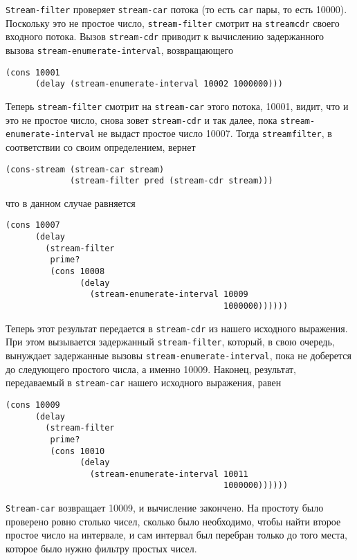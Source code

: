 {\tt Stream-filter} проверяет {\tt stream-car} потока
(то есть {\tt car} пары, то есть 10000).  Поскольку это не
простое число, {\tt stream-filter} смотрит на
{\tt stream\-cdr} своего входного потока.  Вызов %
{\tt stream-cdr} приводит к вычислению задержанного вызова
{\tt stream-enumerate-interval}, возвращающего

\begin{Verbatim}[fontsize=\small]
(cons 10001
      (delay (stream-enumerate-interval 10002 1000000)))
\end{Verbatim}

Теперь {\tt stream-filter} смотрит на {\tt stream-car} этого
потока, 10001, видит, что и это не простое число, снова зовет
{\tt stream-cdr} и так далее, пока
{\tt stream-enumerate-interval} не выдаст простое число 10007.
Тогда {\tt stream\-filter}, в соответствии со своим
определением, вернет

\begin{Verbatim}[fontsize=\small]
(cons-stream (stream-car stream)
             (stream-filter pred (stream-cdr stream)))
\end{Verbatim}
что в данном случае равняется
\begin{Verbatim}[fontsize=\small]
(cons 10007
      (delay
        (stream-filter
         prime?
         (cons 10008
               (delay
                 (stream-enumerate-interval 10009
                                            1000000))))))
\end{Verbatim}

Теперь этот результат передается в {\tt stream-cdr} из нашего
исходного выражения.  При этом вызывается задержанный
{\tt stream-filter}, который, в свою очередь, вынуждает
задержанные вызовы {\tt stream-enumerate-interval}, пока не
доберется до следующего простого числа, а именно 10009.  Наконец,
результат, передаваемый в {\tt stream-car} нашего исходного
выражения, равен

\begin{Verbatim}[fontsize=\small]
(cons 10009
      (delay
        (stream-filter
         prime?
         (cons 10010
               (delay
                 (stream-enumerate-interval 10011
                                            1000000))))))
\end{Verbatim}

{\tt Stream-car} возвращает 10009, и вычисление закончено.  На
простоту было проверено ровно столько чисел, сколько было необходимо,
чтобы найти второе простое число на интервале, и сам интервал был
перебран только до того места, которое было нужно фильтру простых
чисел.

